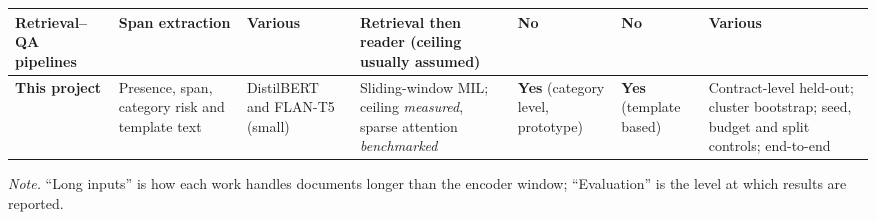 \begin{table}[!ht]
\begin{adjustbox}{max width=\textwidth}
\begin{tabular}{@{}L{25mm} L{23mm} L{21mm} L{25mm} L{17mm} L{16mm} L{23mm}@{}}
\addlinespace
Retrieval--QA pipelines
 & Span extraction & Various & Retrieval then reader (ceiling usually assumed) & No & No & Various\\
\midrule
{}
\textbf{This project}
 & Presence, span, category risk and template text
 & DistilBERT and FLAN-T5 (small)
 & Sliding-window MIL; ceiling \emph{measured}, sparse attention \emph{benchmarked}
 & \textbf{Yes} (category level, prototype)
 & \textbf{Yes} (template based)
 & Contract-level held-out; cluster bootstrap; seed, budget and split controls; end-to-end\\
\bottomrule
\end{tabular}
\end{adjustbox}

\vspace{4pt}
{\footnotesize\singlespacing \emph{Note.} ``Long inputs'' is how each work handles documents longer than the encoder window; ``Evaluation'' is the level at which results are reported.\par}
\end{table}

